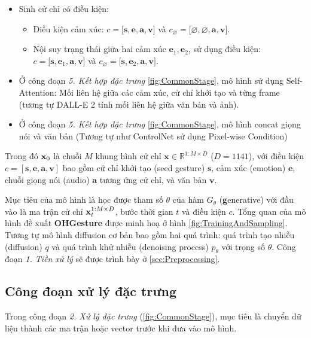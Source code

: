 \begin{itemize}
	\item Sinh cử chỉ có điều kiện:
	\begin{itemize}
		\item Điều kiện cảm xúc: $c = \big[ \mathbf{s}, \mathbf{e}, \mathbf{a}, \mathbf{v} \big]$ và $c_{\varnothing} = \big[ \varnothing, \varnothing, \mathbf{a}, \mathbf{v}\big]$.
		\item Nội suy trạng thái giữa hai cảm xúc $\mathbf{e}_1, \mathbf{e}_2$, sử dụng điều kiện: $c = \big[ \mathbf{s}, \mathbf{e}_1, \mathbf{a}, \mathbf{v} \big]$ và $c_{\varnothing} = \big[ \mathbf{s}, \mathbf{e}_2, \mathbf{a}, \mathbf{v} \big]$.
	\end{itemize}
	\item Ở công đoạn \textit{5. Kết hợp đặc trưng} \autoref{fig:CommonStage}, mô hình sử dụng Self-Attention: Mối liên hệ giữa các cảm xúc, cử chỉ khởi tạo và từng frame (tương tự DALL-E 2 tính mối liên hệ giữa văn bản và ảnh).
	\item Ở công đoạn \textit{5. Kết hợp đặc trưng} \autoref{fig:CommonStage}, mô hình concat giọng nói và văn bản (Tương tự như ControlNet sử dụng Pixel-wise Condition)
\end{itemize}

Trong đó $\mathbf{x}_0$ là chuỗi $M$ khung hình cử chỉ $\mathbf{x} \in \mathbb{R}^{1:M \times D}$ ($D = 1141$), với điều kiện $c = [\mathbf{s}, \mathbf{e}, \mathbf{a}, \mathbf{v}]$ bao gồm cử chỉ khởi tạo (seed gesture) $\mathbf{s}$,  cảm xúc (emotion) $\mathbf{e}$, chuỗi giọng nói (audio) $\mathbf{a}$ tương ứng cử chỉ, và văn bản  $\mathbf{v}$.

Mục tiêu của mô hình là học được tham số $\theta$ của hàm $G_{\theta}$ (\textbf{g}enerative) với đầu vào là ma trận cử chỉ $\mathbf{x}^{1:M \times D}_t$, bước thời gian $t$ và điều kiện $c$.
Tổng quan của mô hình đề xuất \textbf{OHGesture} được minh hoạ ở hình \autoref{fig:TrainingAndSampling}. Tương tự mô hình diffusion cơ bản bao gồm hai quá trình: quá trình tạo nhiễu (diffusion) $q$ và quá trình khử nhiễu (denoising process) $p_{\theta}$ với trọng số $\theta$. Công đoạn \textit{1. Tiền xử lý} sẽ được trình bày ở \autoref{sec:Preprocessing}.

\subsection{Công đoạn xử lý đặc trưng}
Trong công đoạn \textit{2. Xử lý đặc trưng} (\autoref{fig:CommonStage}), mục tiêu là chuyển dữ liệu  thành các ma trận hoặc vector trước khi đưa vào mô hình.

